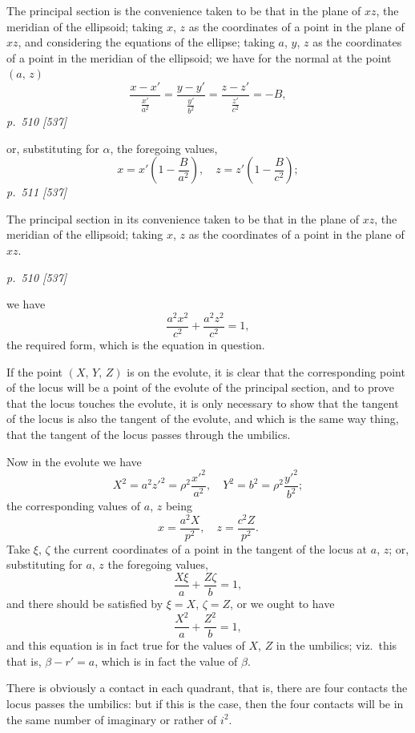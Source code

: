 \documentclass[11pt,a4paper]{book}
\begin{document}
The principal section is the convenience taken to be that in the plane of $xz$,
the meridian of the ellipsoid; taking $x$, $z$ as the coordinates of a point in the plane of
$xz$, and considering the equations of the ellipse; taking $a$, $y$, $z$ as the coordinates of a
point in the meridian of the ellipsoid; we have for the normal at the point $(a,\, z)$
\[
\frac{x - x'}{\frac{x'}{a^2}} = \frac{y - y'}{\frac{y'}{b^2}} = \frac{z - z'}{\frac{z'}{c^2}} = -B,
\]
\textit{p.~510 [537]}

\noindent
or, substituting for $\alpha$, the foregoing values,
\[
x = x'\left(1 - \frac{B}{a^2}\right), \quad z = z'\left(1 - \frac{B}{c^2}\right);
\]
\textit{p.~511 [537]}

The principal section in its convenience taken to be that in the plane of $xz$,
the meridian of the ellipsoid; taking $x$, $z$ as the coordinates of a point in the plane of $xz$.

\clearpage

\bigskip
\textit{p.~510 [537]}
\smallskip

\noindent
we have
\[
\frac{a^2 x^2}{c^2} + \frac{a^2 z^2}{c^2} = 1,
\]
the required form, which is the equation in question.

If the point $(X,\, Y,\, Z)$ is on the evolute, it is clear that the corresponding point
of the locus will be a point of the evolute of the principal section, and to prove
that the locus touches the evolute, it is only necessary to show that the tangent of the
locus is also the tangent of the evolute, and which is the same way thing, that the
tangent of the locus passes through the umbilics.

Now in the evolute we have
\[
X^2 = a^2 z'^2 = \rho^2 \frac{x'^2}{a^2}, \quad Y^2 = b^2 = \rho^2 \frac{y'^2}{b^2};
\]
the corresponding values of $a$, $z$ being
\[
x = \frac{a^2 X}{p^2}, \quad z = \frac{c^2 Z}{p^2}.
\]
Take $\xi$, $\zeta$ the current coordinates of a point in the tangent of the locus at $a$, $z$;
or, substituting for $a$, $z$ the foregoing values,
\[
\frac{X\xi}{a} + \frac{Z\zeta}{b} = 1,
\]
and there should be satisfied by $\xi = X$, $\zeta = Z$, or we ought to have
\[
\frac{X^2}{a} + \frac{Z^2}{b} = 1,
\]
and this equation is in fact true for the values of $X$, $Z$ in the umbilics; viz.\ this
that is, $\beta - r' = a$, which is in fact the value of $\beta$.

There is obviously a contact in each quadrant, that is, there are four contacts
the locus passes the umbilics: but if this is the case, then the four contacts will be
in the same number of imaginary or rather of $i^2$.
\end{document}
